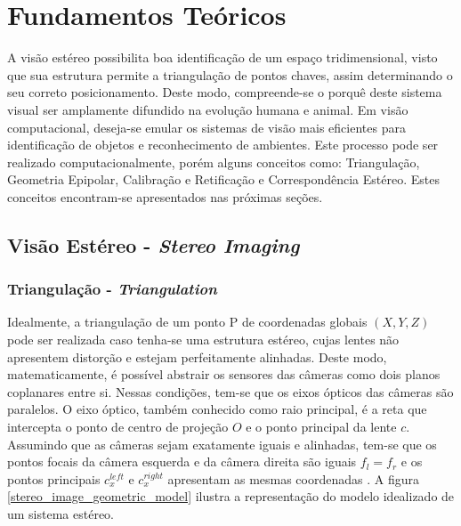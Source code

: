 \chapter{Fundamentos Teóricos}
\label{Revisão Bibliográfica}

A visão estéreo possibilita boa identificação de um espaço tridimensional, visto que sua estrutura permite a triangulação de pontos chaves, assim determinando o seu correto posicionamento. Deste modo, compreende-se o porquê deste sistema visual ser amplamente difundido na evolução humana e animal. Em visão computacional, deseja-se emular os sistemas de visão mais eficientes para identificação de objetos e reconhecimento de ambientes. Este processo pode ser realizado  computacionalmente, porém alguns conceitos como: Triangulação, Geometria Epipolar, Calibração e Retificação e Correspondência Estéreo. Estes conceitos encontram-se apresentados nas próximas seções.


\section{Visão Estéreo - \textit{Stereo Imaging}}
\subsection{Triangulação - \textit{Triangulation}}

Idealmente, a triangulação de um ponto P de coordenadas globais $(X,Y,Z)$ pode ser realizada caso tenha-se uma estrutura estéreo, cujas lentes não apresentem distorção e estejam perfeitamente alinhadas. Deste modo, matematicamente, é possível abstrair os sensores das câmeras como dois planos coplanares entre si. Nessas condições, tem-se que os eixos ópticos das câmeras são paralelos. O eixo óptico, também conhecido como raio principal, é a reta que intercepta o ponto de centro de projeção ${O}$ e o ponto principal da lente ${c}$. Assumindo que as câmeras sejam exatamente iguais e alinhadas, tem-se que os pontos focais da câmera esquerda e da câmera direita são iguais ${f_l = f_r}$ e os pontos principais ${c^{left}_x}$ e  ${c^{right}_x}$ apresentam as mesmas coordenadas \cite{Bradski2008}. A figura \ref{stereo_image_geometric_model} ilustra a representação do modelo idealizado de um sistema estéreo.

